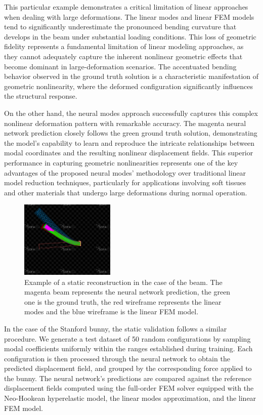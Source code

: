 This particular example demonstrates a critical limitation of linear approaches when dealing with large deformations. The linear modes and linear FEM models tend to significantly underestimate the pronounced bending curvature that develops in the beam under substantial loading conditions. This loss of geometric fidelity represents a fundamental limitation of linear modeling approaches, as they cannot adequately capture the inherent nonlinear geometric effects that become dominant in large-deformation scenarios. The accentuated bending behavior observed in the ground truth solution is a characteristic manifestation of geometric nonlinearity, where the deformed configuration significantly influences the structural response.

On the other hand, the neural modes approach successfully captures this complex nonlinear deformation pattern with remarkable accuracy. The magenta neural network prediction closely follows the green ground truth solution, demonstrating the model's capability to learn and reproduce the intricate relationships between modal coordinates and the resulting nonlinear displacement fields. This superior performance in capturing geometric nonlinearities represents one of the key advantages of the proposed neural modes' methodology over traditional linear model reduction techniques, particularly for applications involving soft tissues and other materials that undergo large deformations during normal operation.

\begin{figure}[H]
    \centering
    \includegraphics[width=0.4\textwidth]{Images/sofa_example_beam.png}
    \caption{Example of a static reconstruction in the case of the beam. The magenta beam represents the neural network prediction, the green one is the ground truth, the red wireframe represents the linear modes and the blue wireframe is the linear FEM model.}
    \label{fig:static_rmse_distribution}
\end{figure}

In the case of the Stanford bunny, the static validation follows a similar procedure. We generate a test dataset of 50 random configurations by sampling modal coefficients uniformly within the ranges established during training. Each configuration is then processed through the neural network to obtain the predicted displacement field, and grouped by the corresponding force applied to the bunny. The neural network's predictions are compared against the reference displacement fields computed using the full-order FEM solver equipped with the Neo-Hookean hyperelastic model, the linear modes approximation, and the linear FEM model.

